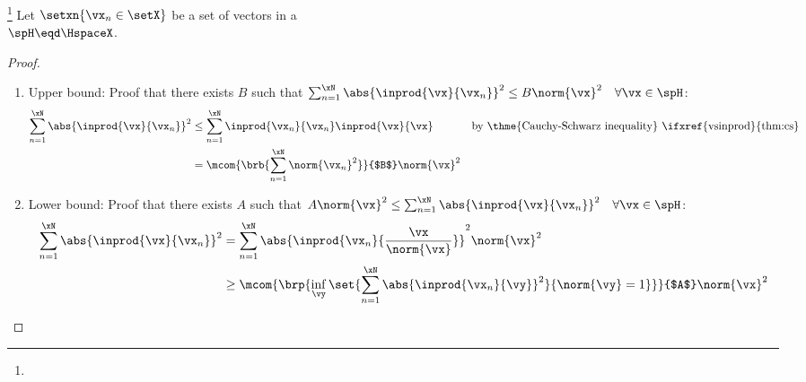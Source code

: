 \begin{theorem}
\footnote{
  }
Let $\setxn{\vx_n\in\setX}$ be a set of vectors in a  \\
$\spH\eqd\HspaceX$.
\end{theorem}
\begin{proof}
\begin{enumerate}
  \item Upper bound: Proof that there exists $B$ such that $\sum_{n=1}^\xN \abs{\inprod{\vx}{\vx_n}}^2\le B\norm{\vx}^2 \quad\forall \vx\in\spH$:
    \begin{align*}
      \sum_{n=1}^\xN \abs{\inprod{\vx}{\vx_n}}^2
        &\le \sum_{n=1}^\xN \inprod{\vx_n}{\vx_n} \inprod{\vx}{\vx}
        &&   \text{by \thme{Cauchy-Schwarz inequality} \ifxref{vsinprod}{thm:cs}}
      \\&=   \mcom{\brb{\sum_{n=1}^\xN \norm{\vx_n}^2}}{$B$} \norm{\vx}^2
    \end{align*}

  \item Lower bound: Proof that there exists $A$ such that $A\norm{\vx}^2\le\sum_{n=1}^\xN \abs{\inprod{\vx}{\vx_n}}^2\quad\forall\vx\in\spH$:
    \begin{align*}
      \sum_{n=1}^\xN \abs{\inprod{\vx}{\vx_n}}^2
        &= {\sum_{n=1}^\xN \abs{\inprod{\vx_n}{\frac{\vx}{\norm{\vx}}}}^2} \norm{\vx}^2
      \\&\ge \mcom{\brp{\inf_\vy\set{\sum_{n=1}^\xN \abs{\inprod{\vx_n}{\vy}}^2}{\norm{\vy}=1}}}{$A$} \norm{\vx}^2
    \end{align*}

\end{enumerate}
\end{proof}




